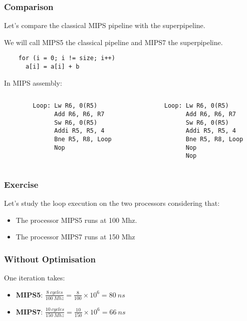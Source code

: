 
\begin{frame}[containsverbatim]
  \frametitle{Comparison}

  Let's compare the classical MIPS pipeline with the superpipeline.

  \-

  We will call MIPS5 the classical pipeline and MIPS7 the superpipeline.

  \begin{verbatim}
    for (i = 0; i != size; i++)
      a[i] = a[i] + b
  \end{verbatim}

  In MIPS assembly:

  \begin{columns}

    \begin{column}{6cm}
      \begin{verbatim}
        Loop: Lw R6, 0(R5)
              Add R6, R6, R7
              Sw R6, 0(R5)
              Addi R5, R5, 4
              Bne R5, R8, Loop
              Nop
      \end{verbatim}
    \end{column}

    \begin{column}{6cm}
      \begin{verbatim}
        Loop: Lw R6, 0(R5)
              Add R6, R6, R7
              Sw R6, 0(R5)
              Addi R5, R5, 4
              Bne R5, R8, Loop
              Nop
              Nop
      \end{verbatim}
    \end{column}
  \end{columns}
\end{frame}


\begin{frame}
  \frametitle{Exercise}

  Let's study the loop execution on the two processors considering that:

  \begin{itemize}
    \item
      The processor MIPS5 runs at 100 Mhz.
    \item
      The processor MIPS7 runs at 150 Mhz
  \end{itemize}
\end{frame}


\begin{frame}
  \frametitle{Without Optimisation}

  One iteration takes:

  \begin{itemize}
    \item
      \textbf{MIPS5}: $\frac{8~cycles}{100~Mhz} =
                       \frac{8}{100} \times 10^{6} =
                       80~ns$
    \item
      \textbf{MIPS7}: $\frac{10~cycles}{150~Mhz} =
                       \frac{10}{150} \times 10^{6} =
                       66~ns$
  \end{itemize}
\end{frame}

